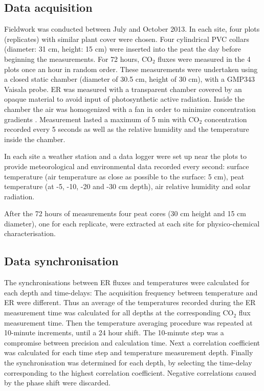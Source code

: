 \subsection{Data acquisition}
Fieldwork was conducted between July and October 2013. 
In each site, four plots (replicates) with similar plant cover were chosen.
Four cylindrical PVC collars (diameter: 31 cm, height: 15 cm) were inserted into the peat the day before beginning the measurements.
For 72 hours, CO$_{2}$ fluxes were measured in the 4 plots once an hour in random order.
These measurements were undertaken using a closed static chamber (diameter of 30.5 cm, height of 30 cm), with a GMP343 Vaisala probe.
ER was measured with a transparent chamber covered by an opaque material to avoid input of photosynthetic active radiation.
Inside the chamber the air was homogenized with a fan in order to minimize concentration gradients \citep{pumpanen2004}.
Measurement lasted a maximum of 5 min with CO$_{2}$ concentration recorded every 5 seconds as well as the relative humidity and the temperature inside the chamber.

In each site a weather station and a data logger were set up near the plots to provide meteorological and environmental data recorded every second: surface temperature (air temperature as close as possible to the surface: 5 cm), peat temperature (at -5, -10, -20 and -30 cm depth), air relative humidity and solar radiation. 

After the 72 hours of measurements four peat cores (30 cm height and 15 cm diameter), one for each replicate, were extracted at each site for physico-chemical characterisation.

\subsection{Data synchronisation}

The synchronisations between ER fluxes and temperatures were calculated for each depth and time-delays: 
The acquisition frequency between temperature and ER were different.
Thus an average of the temperatures recorded during the ER measurement time was calculated for all depths at the corresponding CO$_{2}$ flux measurement time.
Then the temperature averaging procedure was repeated at 10-minute increments, until a 24 hour shift.
The 10-minute step was a compromise between precision and calculation time.
Next a correlation coefficient was calculated for each time step and temperature measurement depth.
Finally the synchronisation was determined for each depth, by selecting the time-delay corresponding to the highest correlation coefficient.
Negative correlations caused by the phase shift were discarded.

